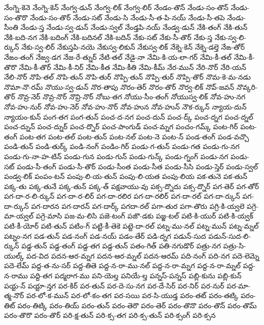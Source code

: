 {నేంగ్నె-కెనె
నేంగ్నె-కెన్
నేంగ్వ-డున్
నేంగ్వ-లిక్
నేంగ్వ-లిర్
నేండం-తొన్
నేండు-సం-తొన్
నేండు-సం-తొరొ
నేండు-సం-తొర్
నేండు-సట్
నేండు-సి
నేండు-సీ-త-పి-నయ్
నేండు-సీ-తపె
నేండు-సీంతి
నేండు-స్త
నేండు-స్వ-డున్
నేండు-స్వల్
నేండ్తపి-నయ్
నేండ్వ-డున్
నేకి-తంగ్
నేకి-తున్
నేకి-బది-నగ
నేకి-బదింగ్
నేకి-బదినల్
నేకి-బదిన్
నేకు-సట్
నేకు-సీ-తొర్
నేకు-స్త
నేకు-స్వ-లి-ర్కున్
నేకు-స్వ-లిర్
నేకుస్తపి-నయె
నేకుస్వ-లికున్
నేకుస్వ-లిక్
నేక్నె-కెన్
నేక్నె-డల్తె
నేఙ-తోర్
నేఙం-తంగ్
నేఙ్వ-డగ
నేజ-రే-త్నుర్
నేటి-తల్
నేడై-నా
నేమి-కి-య-లా-గర్
నేమి-కీ-తల్
నేమి-కీ-తొరొ
నేమి-కీ-తొర్
నేమి-కీ-నిర్
నేమి-కీత
నేమి-కీతి
నేమి-కీమ్
నేర-మున్
నేరి-నొర్
నేరి-యన్
నేలి-నొర్
నొపి-తల్
నొపి-తున్
నొపి-తుర్
నొప్పి-తున్
నొప్పి-తుర్
నొప్పి-తొర్
నొమ-కె-మ-నడు
నొమా-నొ-రమ్
నొయు-స్వ-డున్
నొర-తాపు
నొరం-తెర్
నొరం-తొర్
నొర్వ-లిక్
నొవ్-జవన్
నొవ్కరి-తొర్
నొవ్ర-నెర్
నొవ్ర-నొర్
నొవ్రి-నొర్
నోబు-తగ
నోయు-సీం-తంగ్
నోయుస్వ-లిక్
నోవ-హు-నగ
నోవ-హు-నుర్
నోవ-హు-నెర్
నోవ-హు-నొర్
నోవ-హున
నోవ-హున్
నౌక-ర్కున్
న్యాయ-దున్
న్యాయం-కున్
పంగ-తగ
పంగ-తున్
పంచ-ద-నగ
పంచ-దున్
పంచ-ద్క్
పంచ-ద్నగ
పంచ-ద్నల్
పంచ-ద్నున్
పంచ-ద్నుర్
పంచ-ద్నొర్
పంచ-పాంగుడ్
పంచ-మ్నగ
పంచం-గమ్క్
పంట-గిర్
పంట-తంగ్
పంట-తగ
పంట-తల్
పంట-తున్
పంట-నల్
పంట-నె
పంట-న్
పండ-తంగ్
పండ-వచ్చొ
పండి-తున్
పండి-తుర్క్
పండి-నంగ్
పండిం-గిర్
పండు-గ-తున్
పండు-గత
పండు-గు-నగ
పండు-గు-నా-హ-టిన్
పండు-గున
పండు-గున్
పండు-గున్క్
పండు-గ్నంగ్
పండు-నగ
పండు-సట్
పండు-సీ-తంగ్
పండు-సీ-తొర్
పండు-సీంత
పండు-సీత
పండు-సీసి
పండు-స్తెర్
పండు-స్వల్
పండ్వ-లిక్
పంపం-టన్
పంపు-లి-య-తున్
పంపు-లి-యత
పంపు-లియ
పక-తునె
పక-తున్
పక్క-తు
పక్క-తునే
పక్క-తున్
పక్క-త్
పక్షవాయు-వు
పక్స-ద్నొదు
పక్స-ద్నొర్
పగ-తెర్
పగ-తోర్
పగ-దా-ర-లి-ర్కున్
పగ-దా-ర-లిర్
పగ-దా-రలిర
పగ-దా-రలిర్
పగ-దా-రల్
పగ-దా-ర్కున్
పగ-దా-ర్కున్
పగ-దారన
పగ-దారన్
పగ-దార్క్
పగదా-రల్
పగా-తుర
పగా-తొరు
పగ్రి-కి-య్వలె
పగ్రె-మా-య్వల్
పగ్రె-మాసి
పజ-మ-లిసి
పజె-టంగ్
పజొ-డకు
పజ్జ-టల్
పటి-కి-యుర్
పటి-కి-య్వక్
పటి-కీ-యోర్
పటి-తున్
పటిం-గ్
పట్టి-కీ-తెకె
పట్టె-దా-రల్
పట్న-ము-నల్
పట్న-మున్
పట్న-మ్నల్
పట్నం-నగ
పడ-తున్
పడ-నంగ్
పడ-నయ్
పడం-తేర్
పడి-ద్నగ
పడున్-సుద
పడున్-సుద-లి-ర్కున్
పడ్డ-తున్
పడ్ద-తంగ్
పడ్ద-తగ
పడ్ద-తున్
పతం-గిత్
పతి-నగుడొర్
పత్రు-నగ
పత్రు-సి-యుల్క్
పద-విద
పదన-ఆర-మ్నగ
పదన-ఆర-మ్నల్
పదన-ఆరమ్
పది-నంగ్
పది-నగ
పదె-లెమ్నె
పదె-లేమ్
పద్ద-త-ను-సర్
పద్ద-తితె
పద్ద-న-రా-ము-నల్
పద్ద-న-రా-మ్నగ
పద్ద-న-రా-మ్నల్
పద్ద-న-రాము
పద్ది-తగ
పద్మరాగ-ము
పని-యెల్త
పనియే-ల్త
పన్నస్-పన్నస్
పబ్లి-కును
పబ్లి-కున్
పయ్ట-న్
పయ్టా-న్తగ
పర-కిర్
పర-తున్
పర-దె-సు-నగ
పర-దే-సిర్
పర-నిర్
పర-నుర్
పర-మా-త్మ-నొర్
పర-లో-క-మున్
పర-లో-కం-తగ
పర-సయి
పర-సి-యుడ్త
పరం-తట్
పరం-తట్కి
పరం-తిట్
పరం-తిట్కి
పరం-తియ్
పరం-తున్
పరం-తెరొ
పరం-తెర్
పరం-తొనొ
పరం-తొన్
పరం-తొమ్
పరం-తొరొ
పరం-తొర్
పరి-క్ష-తున్
పరి-క్స-తగ
పరి-క్స-తున్
పరి-క్సంగ్
పరి-క్సన
}
